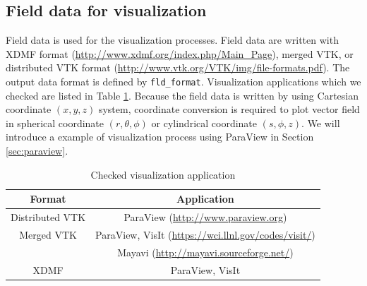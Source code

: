 \subsection{Field data for visualization}
\label{sec:VTK}
 Field data is used for the visualization processes.  Field data are written with XDMF format (\url{http://www.xdmf.org/index.php/Main_Page}), merged VTK, or distributed VTK format (\url{http://www.vtk.org/VTK/img/file-formats.pdf}). The output data format is defined by \verb|fld_format|. Visualization applications which we checked are listed in Table \ref{table:Viz_app}. Because the field data is written by using Cartesian coordinate $(x,y,z)$ system, coordinate conversion is required to plot vector field in spherical coordinate $(r, \theta, \phi)$ or cylindrical coordinate $(s,\phi, z)$. We will introduce a example of visualization process using ParaView in Section \ref{sec:paraview}.
%
%
\begin{table}[htp]
\caption{Checked visualization application}
\label{table:Viz_app}
\begin{center} 
\begin{tabular}{|c|c|}
\hline
 Format & Application  \\ \hline \hline
Distributed VTK & ParaView (\url{http://www.paraview.org})  \\ \hline
Merged VTK & ParaView, VisIt (\url{https://wci.llnl.gov/codes/visit/}) \\
 & Mayavi (\url{http://mayavi.sourceforge.net/}) \\ \hline
XDMF   & ParaView, VisIt   \\ \hline
\end{tabular}
\end{center}
\end{table}
%

